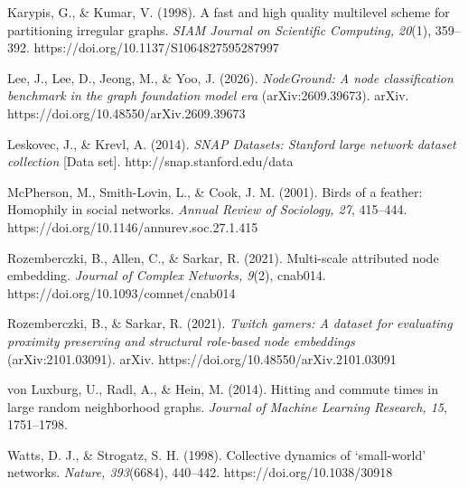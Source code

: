 Karypis, G., \& Kumar, V. (1998). A fast and high quality multilevel scheme for partitioning irregular graphs. \emph{SIAM Journal on Scientific Computing, 20}(1), 359--392. https://doi.org/10.1137/S1064827595287997

Lee, J., Lee, D., Jeong, M., \& Yoo, J. (2026). \emph{NodeGround: A node classification benchmark in the graph foundation model era} (arXiv:2609.39673). arXiv. https://doi.org/10.48550/arXiv.2609.39673

Leskovec, J., \& Krevl, A. (2014). \emph{SNAP Datasets: Stanford large network dataset collection} [Data set]. http://snap.stanford.edu/data

McPherson, M., Smith-Lovin, L., \& Cook, J. M. (2001). Birds of a feather: Homophily in social networks. \emph{Annual Review of Sociology, 27}, 415--444. https://doi.org/10.1146/annurev.soc.27.1.415

Rozemberczki, B., Allen, C., \& Sarkar, R. (2021). Multi-scale attributed node embedding. \emph{Journal of Complex Networks, 9}(2), cnab014. https://doi.org/10.1093/comnet/cnab014

Rozemberczki, B., \& Sarkar, R. (2021). \emph{Twitch gamers: A dataset for evaluating proximity preserving and structural role-based node embeddings} (arXiv:2101.03091). arXiv. https://doi.org/10.48550/arXiv.2101.03091

von Luxburg, U., Radl, A., \& Hein, M. (2014). Hitting and commute times in large random neighborhood graphs. \emph{Journal of Machine Learning Research, 15}, 1751--1798.

Watts, D. J., \& Strogatz, S. H. (1998). Collective dynamics of `small-world' networks. \emph{Nature, 393}(6684), 440--442. https://doi.org/10.1038/30918
